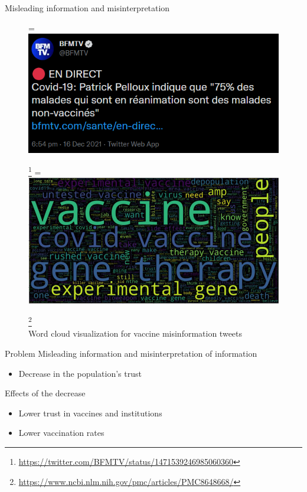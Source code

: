 \documentclass{beamer}
\newcommand{\vcenteredhbox}[1]{\begingroup
\setbox0=\hbox{#1}\parbox{\wd0}{\box0}\endgroup}
\begin{document}
\begin{frame}{Misleading information and misinterpretation}
    \begin{figure}[htpb]
        \begin{center}
            \vcenteredhbox{\includegraphics[width=0.4\linewidth]{fig/bfmtv_tweet.png}}
            \footnote{{\tiny \url{https://twitter.com/BFMTV/status/1471539246985060360}}}
            \vcenteredhbox{\includegraphics[width=0.7\linewidth]{fig/antivax_twitter_data.jpg}}
            \footnote{{\tiny \url{https://www.ncbi.nlm.nih.gov/pmc/articles/PMC8648668/}}}
            \\Word cloud visualization for vaccine misinformation tweets
        \end{center}
    \end{figure}
\end{frame}

\begin{frame}{Problem}
    Misleading information and misinterpretation of information
    \begin{itemize}
        \item Decrease in the population's trust
    \end{itemize}
    \vspace{1.5\baselineskip}
    Effects of the decrease
    \begin{itemize}
        \item Lower trust in vaccines and institutions
        \item Lower vaccination rates
    \end{itemize}
\end{frame}
\end{document}
